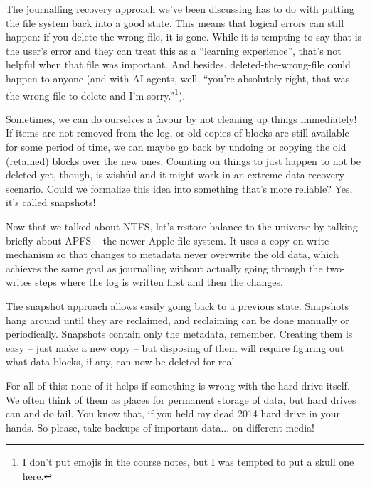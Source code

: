 The journalling recovery approach we've been discussing has to do with putting the file system back into a good state. This means that logical errors can still happen: if you delete the wrong file, it is gone. While it is tempting to say that is the user's error and they can treat this as a ``learning experience'', that's not helpful when that file was important. And besides, deleted-the-wrong-file could happen to anyone (and with AI agents, well, ``you're absolutely right, that was the wrong file to delete and I'm sorry.''\footnote{I don't put emojis in the course notes, but I was tempted to put a skull one here.}). 

Sometimes, we can do ourselves a favour by not cleaning up things immediately! If items are not removed from the log, or old copies of blocks are still available for some period of time, we can maybe go back by undoing or copying the old (retained) blocks over the new ones. Counting on things to just happen to not be deleted yet, though, is wishful and it might work in an extreme data-recovery scenario. Could we formalize this idea into something that's more reliable? Yes, it's called snapshots!

Now that we talked about NTFS, let's restore balance to the universe by talking briefly about APFS -- the newer Apple file system. It uses a copy-on-write mechanism so that changes to metadata never overwrite the old data, which achieves the same goal as journalling without actually going through the two-writes steps where the log is written first and then the changes. 

The snapshot approach allows easily going back to a previous state. Snapshots hang around until they are reclaimed, and reclaiming can be done manually or periodically. Snapshots contain only the metadata, remember. Creating them is easy -- just make a new copy -- but disposing of them will require figuring out what data blocks, if any, can now be deleted for real.

For all of this: none of it helps if something is wrong with the hard drive itself. We often think of them as places for permanent storage of data, but hard drives can and do fail. You know that, if you held my dead 2014 hard drive in your hands. So please, take backups of important data... on different media!


